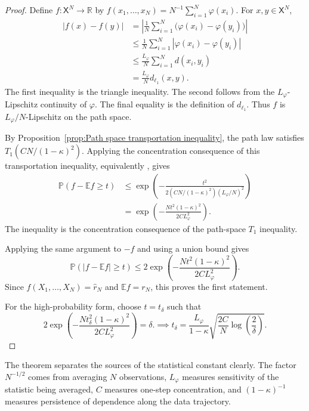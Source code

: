 \begin{proof}
Define \(f:\mathsf X^N\to\mathbb R\) by \(f(x_1,\ldots,x_N)=N^{-1}\sum_{i=1}^N\varphi(x_i)\). For \(x,y\in\mathsf X^N\),
\[
\begin{aligned}
|f(x)-f(y)|
&=
\left|
\frac1N
\sum_{i=1}^N
\bigl(
\varphi(x_i)-\varphi(y_i)
\bigr)
\right|
\\
&\leqslant
\frac1N
\sum_{i=1}^N
|\varphi(x_i)-\varphi(y_i)|
\\
&\leqslant
\frac{L_\varphi}{N}
\sum_{i=1}^N
d(x_i,y_i)
\\
&=
\frac{L_\varphi}{N}
d_{\ell_1}(x,y).
\end{aligned}
\]
The first inequality is the triangle inequality. The second follows from the \(L_\varphi\)-Lipschitz continuity of \(\varphi\). The final equality is the definition of \(d_{\ell_1}\). Thus \(f\) is \(L_\varphi/N\)-Lipschitz on the path space.

By Proposition~\ref{prop:Path space transportation inequality}, the path law satisfies \(T_1(CN/(1-\kappa)^2)\). Applying the concentration consequence of this transportation inequality, equivalently \cite[Corollary~2.6]{DjelloutGuillinWu2004}, gives
\[
\begin{aligned}
\mathbb P
\left(
f-\mathbb Ef
\geq t
\right)
&\leqslant
\exp
\left(
-\frac{
t^2
}{
2
\left(
CN/(1-\kappa)^2
\right)
\left(
L_\varphi/N
\right)^2
}
\right)
\\
&=
\exp
\left(
-\frac{
Nt^2(1-\kappa)^2
}{
2CL_\varphi^2
}
\right).
\end{aligned}
\]
The inequality is the concentration consequence of the path-space \(T_1\) inequality. 

Applying the same argument to \(-f\) and using a union bound gives
\[
\mathbb P
\left(
|f-\mathbb Ef|
\geq t
\right)
\leqslant
2
\exp
\left(
-\frac{
Nt^2(1-\kappa)^2
}{
2CL_\varphi^2
}
\right).
\]
Since \(f(X_1,\ldots,X_N)=\widehat r_N\) and \(\mathbb Ef=r_N\), this proves the first statement.

For the high-probability form, choose \(t=t_\delta\) such that
\[
2
\exp
\left(
-\frac{
Nt_\delta^2(1-\kappa)^2
}{
2CL_\varphi^2
}
\right)
=
\delta.
\implies
t_\delta
=
\frac{L_\varphi}{1-\kappa}
\sqrt{
\frac{2C}{N}
\log
\left(
\frac2\delta
\right)
}.
\]
\end{proof}

The theorem separates the sources of the statistical constant clearly. The factor \(N^{-1/2}\) comes from averaging \(N\) observations, \(L_\varphi\) measures sensitivity of the statistic being averaged, \(C\) measures one-step concentration, and \((1-\kappa)^{-1}\) measures persistence of dependence along the data trajectory.

